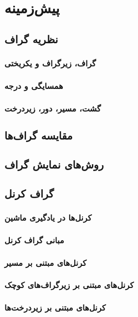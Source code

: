 \chapter{پیش‌زمینه}\label{chap:prerequisites}
\section{نظریه گراف}
\subsection{گراف، زیرگراف و یکریختی}
\subsection{همسایگی و درجه}
\subsection{گشت، مسیر، دور، زیردرخت}
\section{مقایسه گراف‌ها}
\section{روش‌های نمایش گراف}
\section{گراف کرنل}
\subsection{کرنل‌ها در یادگیری ماشین}
\subsection{مبانی گراف کرنل‌}
\subsection{کرنل‌های مبتنی بر مسیر}
\subsection{کرنل‌های مبتنی بر زیرگراف‌های کوچک}
\subsection{کرنل‌های مبتنی بر زیردرخت‌ها}
